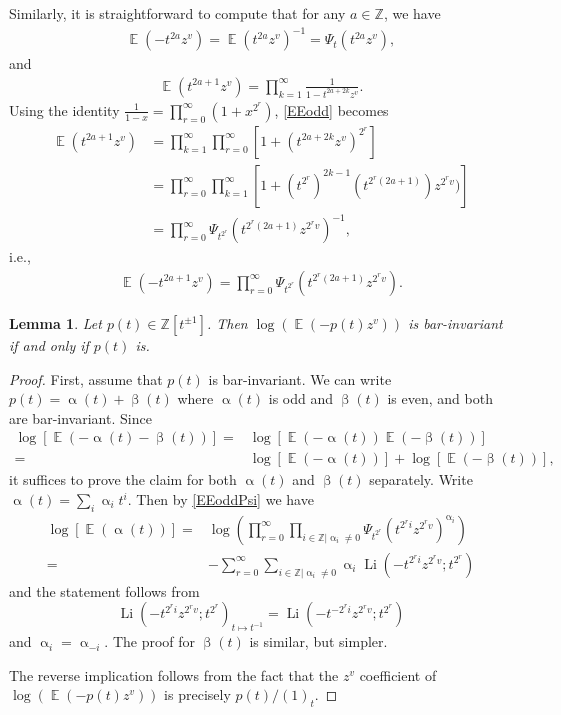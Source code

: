 \documentclass{amsart}
\DeclareMathOperator{\EE}{\mathbb{E}}
\DeclareMathOperator{\Li}{Li}
\let\bb=\mathbb
\renewcommand{\alpha}{\upalpha}
\renewcommand{\beta}{\upbeta}
\theoremstyle{plain}%
\newtheorem{lem}[thm]{Lemma}
\theoremstyle{definition}
\theoremstyle{remark}
\begin{document}
Similarly, it is straightforward to compute that for any $a\in \bb{Z}$, we have
\begin{align}\label{EEeven}
    \EE(-t^{2a}z^v)=\EE(t^{2a}z^v)^{-1}=\Psi_t(t^{2a}z^v),
\end{align}
and
\begin{align}\label{EEodd}
    \EE(t^{2a+1}z^v)=\prod_{k=1}^{\infty} \frac{1}{1-t^{2a+2k}z^{v}}.
\end{align}
Using the identity $\frac{1}{1-x}=\prod_{r=0}^{\infty} (1+x^{2^r})$, \eqref{EEodd} becomes
\begin{align}\nonumber
    \EE(t^{2a+1}z^v) &= \prod_{k=1}^{\infty}\prod_{r=0}^{\infty} [1+(t^{2a+2k}z^{v})^{2^r}] \\
    &=\prod_{r=0}^{\infty}\prod_{k=1}^{\infty} [1+(t^{2^r})^{2k-1} (t^{2^r(2a+1)})z^{2^rv})] \nonumber \\
    &=\prod_{r=0}^{\infty}\Psi_{t^{2^r}}(t^{2^r(2a+1)}z^{2^rv})^{-1},\nonumber
\end{align}
i.e.,
\begin{align}\label{EEoddPsi}
    \EE(-t^{2a+1}z^v)=\prod_{r=0}^{\infty}\Psi_{t^{2^r}}(t^{2^r(2a+1)}z^{2^rv}).
\end{align}



\begin{lem}\label{log_barinv}
Let $p(t)\in\mathbb{Z}[t^{\pm 1}]$.  Then $\log(\EE(-p(t)z^v))$ is bar-invariant if and only if $p(t)$ is.
\end{lem}
\begin{proof}
First, assume that $p(t)$ is bar-invariant.  We can write $p(t)=\alpha(t)+\beta(t)$ where $\alpha(t)$ is odd and $\beta(t)$ is even, and both are bar-invariant.  Since 
\begin{align*}
\log\left[\EE(-\alpha(t)-\beta(t))\right]=&\log\left[\EE(-\alpha(t))\EE(-\beta(t))\right]\\
=&\log\left[\EE(-\alpha(t))\right]+\log\left[\EE(-\beta(t))\right],
\end{align*}
it suffices to prove the claim for both $\alpha(t)$ and $\beta(t)$ separately.  Write $\alpha(t)=\sum_i \alpha_it^i$.  Then by \eqref{EEoddPsi} we have
\begin{align*}
    \log[\EE(\alpha(t))]=&\log\left(\prod_{r=0}^{\infty}\prod_{i\in\mathbb{Z}\lvert   \alpha_i\neq 0}\Psi_{t^{2^r}}(t^{2^ri}z^{2^rv})^{\alpha_i}\right)\\
    =&-\sum_{r=0}^{\infty}\sum_{i\in\mathbb{Z}\lvert \alpha_i\neq 0}\alpha_i\Li(-t^{2^ri}z^{2^rv};t^{2^r})
\end{align*}
and the statement follows from
\[
\Li(-t^{2^ri}z^{2^rv};t^{2^r})_{t\mapsto t^{-1}}=\Li(-t^{-2^ri}z^{2^rv};t^{2^r})
\]
and $\alpha_i=\alpha_{-i}$.  The proof for $\beta(t)$ is similar, but simpler.

The reverse implication follows from the fact that the $z^v$ coefficient of $\log(\EE(-p(t)z^v))$ is precisely $p(t)/(1)_t$.
\end{proof}
\end{document}
